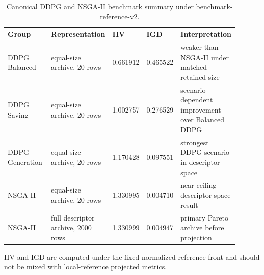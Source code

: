 \begin{table}[H]
\begin{revblock}
\caption{Canonical DDPG and NSGA-II benchmark summary under benchmark-reference-v2.}
\label{tab:canonical-benchmark}
\centering
\scriptsize
\begin{threeparttable}
\begin{tabularx}{\linewidth}{@{}p{0.23\linewidth}p{0.17\linewidth}p{0.12\linewidth}p{0.12\linewidth}p{0.26\linewidth}@{}}
\toprule
Group & Representation & HV & IGD & Interpretation \\
\midrule
DDPG Balanced & equal-size archive, 20 rows & 0.661912 & 0.465522 & weaker than NSGA-II under matched retained size \\
DDPG Saving & equal-size archive, 20 rows & 1.002757 & 0.276529 & scenario-dependent improvement over Balanced DDPG \\
DDPG Generation & equal-size archive, 20 rows & 1.170428 & 0.097551 & strongest DDPG scenario in descriptor space \\
NSGA-II & equal-size archive, 20 rows & 1.330995 & 0.004710 & near-ceiling descriptor-space result \\
NSGA-II & full descriptor archive, 2000 rows & 1.330999 & 0.004947 & primary Pareto archive before projection \\
\bottomrule
\end{tabularx}
\begin{tablenotes}[flushleft]
\footnotesize
\item HV and IGD are computed under the fixed normalized reference front and should not be mixed with local-reference projected metrics.
\end{tablenotes}
\end{threeparttable}
\end{revblock}
\end{table}

\begin{figure}[H]
\centering
{}
\caption{}
\label{fig:canonical-benchmark}
\end{figure}


